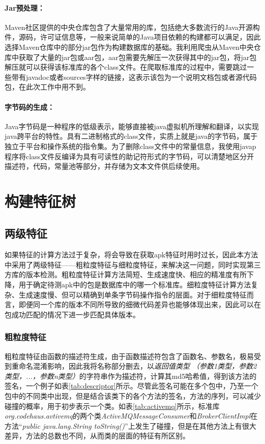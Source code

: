 \paragraph{Jar预处理：}Maven社区提供的中央仓库\cite{maven}包含了大量常用的库，包括绝大多数流行的Java开源构件，源码，许可证信息等，一般来说简单的Java项目依赖的构建都可以满足，因此选择Maven仓库中的部分jar包作为构建数据库的基础。我利用爬虫从Maven中央仓库中获取了大量的jar包或aar包，aar包需要先解压一次获得其中的jar包，将jar包解压就可以获得该标准库的各个class文件。在爬取标准库的过程中，需要跳过一些带有javadoc或者sources字样的链接，这表示该包为一个说明文档包或者源代码包，在此次工作中用不到。


\paragraph{字节码的生成：}Java字节码是一种程序的低级表示，能够直接被java虚拟机所理解和翻译，以实现java跨平台的特性。具有二进制格式的class文件，实质上就是java的字节码，属于独立于平台和操作系统的指令集。为了删除class文件中的常量信息，我使用javap程序将class文件反编译为具有可读性的助记符形式的字节码，可以清楚地区分开描述符，代码，常量池等部分，并存储为文本文件供后续使用。




\section{构建特征树}

\subsection{两级特征}
如果特征的计算方法过于复杂，将会导致在获取apk特征时用时过长，因此本方法中采用了两级特征——粗粒度特征与细粒度特征，来解决这一问题，同时实现第三方库的版本检测。粗粒度特征计算方法简短、生成速度快、相应的精准度有所下降，用于确定待测apk中的包是数据库中的哪一个标准库。细粒度特征计算方法复杂、生成速度慢、但可以精确到单条字节码操作指令的层面。对于细粒度特征而言，即便同一个库的版本不同所导致的细微代码差异也能够体现出来，因此可以在包成功匹配的情况下进一步匹配具体版本。


\subsubsection{粗粒度特征}

粗粒度特征由函数的描述符生成，由于函数描述符包含了函数名、参数名，极易受到重命名混淆影响，因此我将名称部分删去，以\textit{返回值类型 （参数1类型，参数2类型，...，参数n类型）}的字符串作为描述符，计算其md5哈希值，得到该方法的签名，一个例子如表\ref{tab:descriptor}所示。尽管此签名可能在多个包中，乃至一个包中的不同类中出现，但是结合该类下的各个方法的签名，方法的序列，可以减少碰撞的概率，用于初步表示一个类。如表\ref{tab:activemq}所示，标准库\textit{org.codehaus.avtivemq}的两个类\textit{ActiveMQMessageConsumer}和\textit{BrokerClientImpl}在方法“\textit{public java.lang.String toString()}”上发生了碰撞，但是在其他方法上有很大差异，方法的总数也不同，从而类的层面的特征有所区别。


